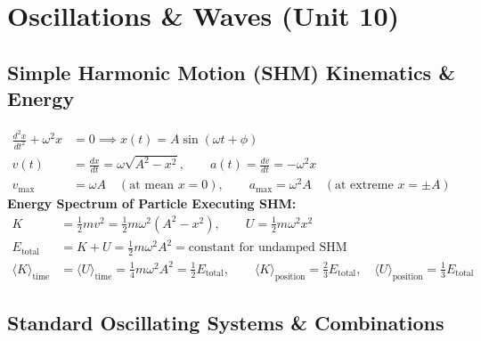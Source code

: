 \documentclass[11pt,a4paper]{article}
\begin{document}
\section{Oscillations \& Waves (Unit 10)}

\subsection{Simple Harmonic Motion (SHM) Kinematics \& Energy}

\begin{formulabox}
\begin{align}
  \frac{d^2 x}{dt^2} + \omega^2 x &= 0 \implies x(t) = A\sin(\omega t + \phi) \\
  v(t) &= \frac{dx}{dt} = \omega\sqrt{A^2 - x^2}, \qquad a(t) = \frac{dv}{dt} = -\omega^2 x \\
  v_{\max} &= \omega A \quad (\text{at mean } x=0), \qquad a_{\max} = \omega^2 A \quad (\text{at extreme } x=\pm A)
\end{align}
\textbf{Energy Spectrum of Particle Executing SHM:}
\begin{align}
  K &= \frac{1}{2}m v^2 = \frac{1}{2}m\omega^2(A^2 - x^2), \qquad U = \frac{1}{2}m\omega^2 x^2 \\
  E_{\text{total}} &= K + U = \frac{1}{2}m\omega^2 A^2 = \text{constant for undamped SHM} \\
  \langle K \rangle_{\text{time}} &= \langle U \rangle_{\text{time}} = \frac{1}{4}m\omega^2 A^2 = \frac{1}{2}E_{\text{total}}, \qquad \langle K \rangle_{\text{position}} = \frac{2}{3}E_{\text{total}}, \quad \langle U \rangle_{\text{position}} = \frac{1}{3}E_{\text{total}}
\end{align}
\end{formulabox}

\subsection{Standard Oscillating Systems \& Combinations}
\end{document}
